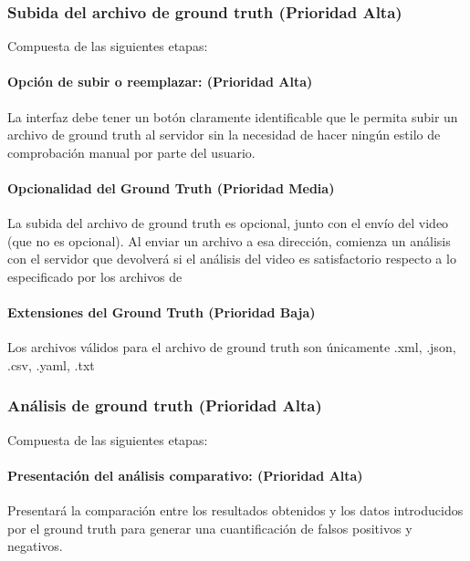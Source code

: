 \documentclass[a4paper]{article}
\begin{document}
{    \subsubsection{Subida del archivo de ground truth (Prioridad Alta)}
    	Compuesta de las siguientes etapas: \\
		
        \paragraph{Opción de subir o reemplazar: (Prioridad Alta)}
     	La interfaz debe tener un botón claramente identificable que le permita subir un archivo de ground truth al servidor sin la necesidad de hacer ningún estilo de comprobación manual por parte del usuario. \\ 
        
        \paragraph{Opcionalidad del Ground Truth (Prioridad Media)}
        La subida del archivo de ground truth es opcional, junto con el envío del video (que no es opcional). Al enviar un archivo a esa dirección, comienza un análisis con el servidor que devolverá si el análisis del video es satisfactorio respecto a lo especificado por los archivos de \\ 
         
        \paragraph{Extensiones del Ground Truth (Prioridad Baja)}
		 Los archivos válidos para el archivo de ground truth son únicamente .xml, .json, .csv, .yaml, .txt\\ 
         
    \subsubsection{Análisis de ground truth (Prioridad Alta)}
    	Compuesta de las siguientes etapas: \\
		
        \paragraph{Presentación del análisis comparativo: (Prioridad Alta)}
     	Presentará la comparación entre los resultados obtenidos y los datos introducidos por el ground truth para generar una cuantificación de falsos positivos y negativos. \\ 

}
\end{document}
